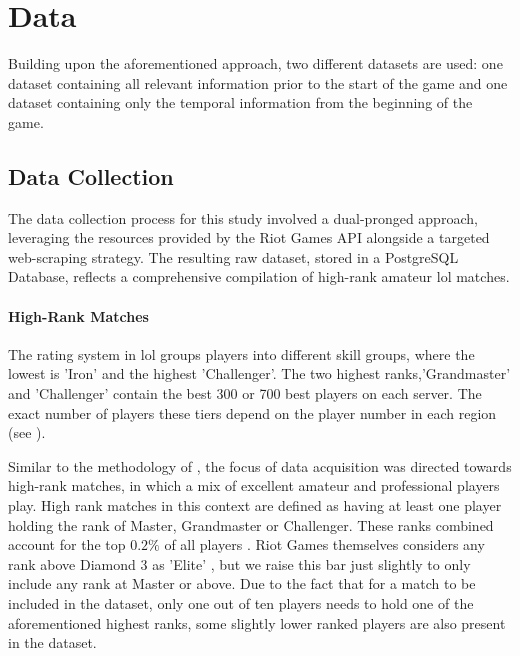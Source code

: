 \documentclass[12pt, a4paper, headinclude, twoside, plainheadsepline, open=right, numbers=noenddot, hidelinks, toc=listof, toc=bibliography]{scrreprt}
\begin{document}
\section{Data}
\label{sec:data}

Building upon the aforementioned approach, two different datasets are used: one dataset containing all relevant information prior to the start of the game and one dataset containing only the temporal information from the beginning of the game.


\subsection{Data Collection}
\label{ssec:datacoll}

The data collection process for this study involved a dual-pronged approach, leveraging the resources provided by the Riot Games API alongside a targeted web-scraping strategy.
The resulting raw dataset, stored in a PostgreSQL Database, reflects a comprehensive compilation of high-rank amateur \acl{lol} matches.

\paragraph{High-Rank Matches}
The rating system in \ac{lol} groups players into different skill groups, where the lowest is 'Iron' and the highest 'Challenger'.
The two highest ranks,'Grandmaster' and 'Challenger' contain the best 300 or 700 best players on each server.
The exact number of players these tiers depend on the player number in each region (see \cite{riotgamesMasterGrandmasterChallenger2023}).

Similar to the methodology of \citeauthor{zhangPredictionEsportsGame2021} \cite{zhangPredictionEsportsGame2021}, the focus of data acquisition was directed towards high-rank matches, in which a mix of excellent amateur and professional players play.
High rank matches in this context are defined as having at least one player holding the rank of Master, Grandmaster or Challenger.
These ranks combined account for the top $0.2\%$ of all players \cite{riotgamesRankedTiersDivisions2023}.
Riot Games themselves considers any rank above Diamond 3 as 'Elite' \cite{riotgamesDevBalanceFramework2020}, but we raise this bar just slightly to only include any rank at Master or above.
Due to the fact that for a match to be included in the dataset, only one out of ten players needs to hold one of the aforementioned highest ranks, some slightly lower ranked players are also present in the dataset.
\end{document}
